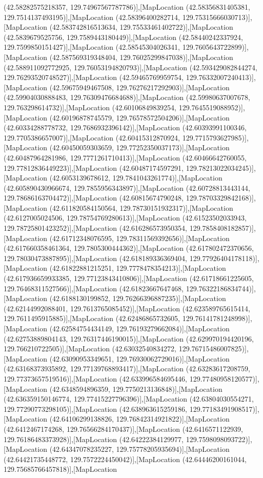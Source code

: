 (42.58282575218357, 129.74967567787786)],[MapLocation (42.58356831405381, 129.7514137493195)],[MapLocation (42.58396400282714, 129.75315666030713)],[MapLocation (42.583742816513634, 129.75533461402722)],[MapLocation (42.5839679525756, 129.7589443180449)],[MapLocation (42.58440242337924, 129.7599850151427)],[MapLocation (42.58545304026341, 129.7605643722899)],[MapLocation (42.587569319348404, 129.76025299847038)],[MapLocation (42.588911092772925, 129.76053194820793)],[MapLocation (42.593429082844274, 129.76293520748527)],[MapLocation (42.59465769959754, 129.76332007240413)],[MapLocation (42.59675949467508, 129.76276217292903)],[MapLocation (42.59904030888483, 129.76309476684688)],[MapLocation (42.59980637007678, 129.763298614732)],[MapLocation (42.60106849839254, 129.7645519088952)],[MapLocation (42.60196878745579, 129.76578572504206)],[MapLocation (42.60334288778732, 129.7686932396142)],[MapLocation (42.60393991100346, 129.7705386657007)],[MapLocation (42.60415312870924, 129.7715793627985)],[MapLocation (42.60450059303659, 129.77252350037173)],[MapLocation (42.60487964281986, 129.7771261710413)],[MapLocation (42.60466642760055, 129.77812836449223)],[MapLocation (42.60487174597291, 129.78213022034245)],[MapLocation (42.6053139678612, 129.7841043261774)],[MapLocation (42.605890430966674, 129.7855956343897)],[MapLocation (42.60728813443144, 129.78686163704472)],[MapLocation (42.60815674790248, 129.78703329842168)],[MapLocation (42.611820584150564, 129.78730151932317)],[MapLocation (42.6127005024506, 129.78754769280613)],[MapLocation (42.61523502033943, 129.78725801423252)],[MapLocation (42.616286573950354, 129.7858408182857)],[MapLocation (42.61712348076595, 129.78311569392656)],[MapLocation (42.617660358461364, 129.7805300444362)],[MapLocation (42.617802472370656, 129.78030473887895)],[MapLocation (42.618189336369404, 129.77926404178118)],[MapLocation (42.61822881215251, 129.7778478354213)],[MapLocation (42.617936659933385, 129.77123843410806)],[MapLocation (42.61718661225605, 129.76468311527566)],[MapLocation (42.61823667647468, 129.76322186834744)],[MapLocation (42.6188130199852, 129.76266396887235)],[MapLocation (42.62144992088401, 129.7613765085452)],[MapLocation (42.623589765615414, 129.7611495915885)],[MapLocation (42.62486865732605, 129.76141781248998)],[MapLocation (42.62584754434149, 129.76193279662084)],[MapLocation (42.62753889804143, 129.76317446190015)],[MapLocation (42.629970194420196, 129.766210722505)],[MapLocation (42.63032540834272, 129.76715486007825)],[MapLocation (42.63090953349651, 129.76930062729016)],[MapLocation (42.63168373935892, 129.77139768893417)],[MapLocation (42.63283617208759, 129.77373657519516)],[MapLocation (42.633996584695446, 129.77480958120577)],[MapLocation (42.6348594896359, 129.7750213136848)],[MapLocation (42.636359150146774, 129.77415227796396)],[MapLocation (42.63804030554271, 129.77290773298105)],[MapLocation (42.638963615259186, 129.77183491908517)],[MapLocation (42.64106299138826, 129.76842314921822)],[MapLocation (42.6412467174268, 129.76566284170437)],[MapLocation (42.6416571122939, 129.76186483373928)],[MapLocation (42.64222384129977, 129.7598098093722)],[MapLocation (42.64347078235227, 129.75778205935694)],[MapLocation (42.64421735448772, 129.7572224450042)],[MapLocation (42.64446200161044, 129.75685766457818)],[MapLocation 